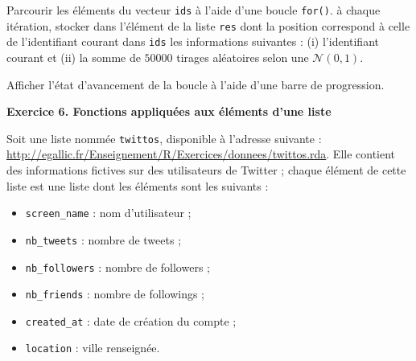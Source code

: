 \documentclass[
  11pt,
]{book}
\makeatletter
\providecommand{\tightlist}{%
  \setlength{\itemsep}{0pt}\setlength{\parskip}{0pt}}
\numberwithin{equation}{section}
\numberwithin{countremarque}{section}
\newenvironment{exframe}{%
 \def\at@end@of@exframe{}%
 \ifinner\ifhmode%
  \def\at@end@of@exframe{\end{minipage}}%
  \begin{minipage}{\columnwidth}%
 \fi\fi%
 \def\FrameCommand##1{\hskip\@totalleftmargin \hskip-\fboxsep
 \colorbox{shadecolorex}{##1}\hskip-\fboxsep
     \hskip-\linewidth \hskip-\@totalleftmargin \hskip\columnwidth}%
 \MakeFramed {\advance\hsize-\width
   \@totalleftmargin\z@ \linewidth\hsize
   \@setminipage}}%
 {\par\unskip\endMakeFramed%
 \at@end@of@exframe}
\makeatother
\begin{document}
\begin{exframe}
Parcourir les éléments du vecteur \texttt{ids} à l'aide d'une boucle \texttt{for()}. à chaque itération, stocker dans l'élément de la liste \texttt{res} dont la position correspond à celle de l'identifiant courant dans \texttt{ids} les informations suivantes : (i) l'identifiant courant et (ii) la somme de \(50 000\) tirages aléatoires selon une \(\mathcal{N}(0,1)\).

Afficher l'état d'avancement de la boucle à l'aide d'une barre de progression.
\end{exframe}

\begin{exframe}
\textbf{Exercice 6. Fonctions appliquées aux éléments d'une liste}

Soit une liste nommée \texttt{twittos}, disponible à l'adresse suivante : \url{http://egallic.fr/Enseignement/R/Exercices/donnees/twittos.rda}. Elle contient des informations fictives sur des utilisateurs de Twitter ; chaque élément de cette liste est une liste dont les éléments sont les suivants :

\begin{itemize}
\tightlist
\item
  \texttt{screen\_name} : nom d'utilisateur ;
\item
  \texttt{nb\_tweets} : nombre de tweets ;
\item
  \texttt{nb\_followers} : nombre de followers ;
\item
  \texttt{nb\_friends} : nombre de followings ;
\item
  \texttt{created\_at} : date de création du compte ;
\item
  \texttt{location} : ville renseignée.
\end{itemize}


\end{exframe}
\end{document}
